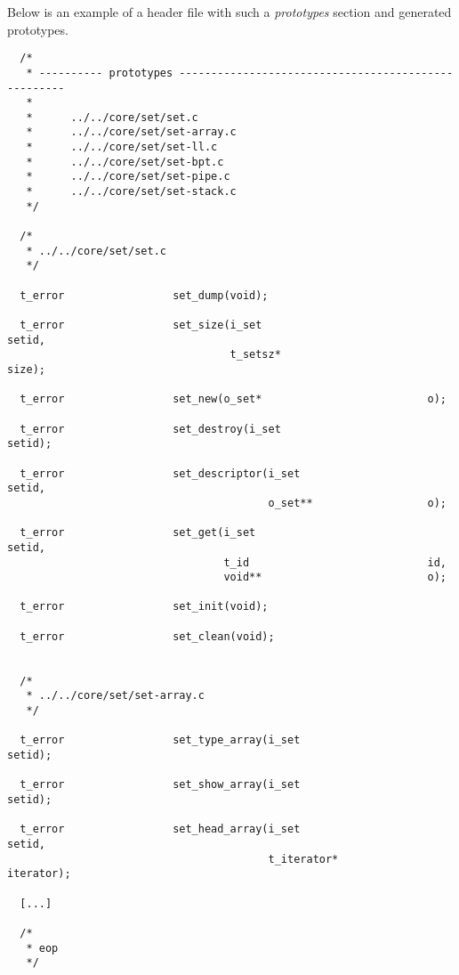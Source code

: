 Below is an example of a header file with such a \textit{prototypes}
section and generated prototypes.

\begin{verbatim}
  /*
   * ---------- prototypes ----------------------------------------------------
   *
   *      ../../core/set/set.c
   *      ../../core/set/set-array.c
   *      ../../core/set/set-ll.c
   *      ../../core/set/set-bpt.c
   *      ../../core/set/set-pipe.c
   *      ../../core/set/set-stack.c
   */

  /*
   * ../../core/set/set.c
   */

  t_error                 set_dump(void);

  t_error                 set_size(i_set                          setid,
                                   t_setsz*                       size);

  t_error                 set_new(o_set*                          o);

  t_error                 set_destroy(i_set                       setid);

  t_error                 set_descriptor(i_set                    setid,
                                         o_set**                  o);

  t_error                 set_get(i_set                           setid,
                                  t_id                            id,
                                  void**                          o);

  t_error                 set_init(void);

  t_error                 set_clean(void);


  /*
   * ../../core/set/set-array.c
   */

  t_error                 set_type_array(i_set                    setid);

  t_error                 set_show_array(i_set                    setid);

  t_error                 set_head_array(i_set                    setid,
                                         t_iterator*              iterator);

  [...]

  /*
   * eop
   */
\end{verbatim}
